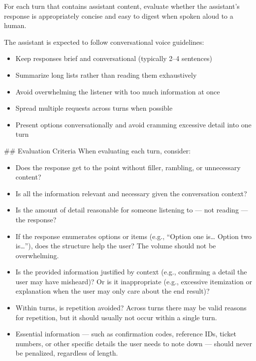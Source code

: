 \begin{tcolorbox}[promptbox, title={\small Conciseness Prompt}]
      For each turn that contains assistant content, evaluate whether the assistant's response is appropriately concise and easy to digest when spoken aloud to a human.\newline

      The assistant is expected to follow conversational voice guidelines:
      \begin{itemize}
        \item Keep responses brief and conversational (typically 2--4 sentences)
        \item Summarize long lists rather than reading them exhaustively
        \item Avoid overwhelming the listener with too much information at once
        \item Spread multiple requests across turns when possible
        \item Present options conversationally and avoid cramming excessive detail into one turn
      \end{itemize}

      \#\# Evaluation Criteria\newline
      When evaluating each turn, consider:
      \begin{itemize}
        \item Does the response get to the point without filler, rambling, or unnecessary content?
        \item Is all the information relevant and necessary given the conversation context?
        \item Is the amount of detail reasonable for someone listening to --- not reading --- the response?
        \item If the response enumerates options or items (e.g., ``Option one is\ldots{} Option two is\ldots{}''), does the structure help the user? The volume should not be overwhelming.
        \item Is the provided information justified by context (e.g., confirming a detail the user may have misheard)? Or is it inappropriate (e.g., excessive itemization or explanation when the user may only care about the end result)?
        \item Within turns, is repetition avoided? Across turns there may be valid reasons for repetition, but it should usually not occur within a single turn.
        \item Essential information --- such as confirmation codes, reference IDs, ticket numbers, or other specific details the user needs to note down --- should never be penalized, regardless of length.
      \end{itemize}


\end{tcolorbox}
